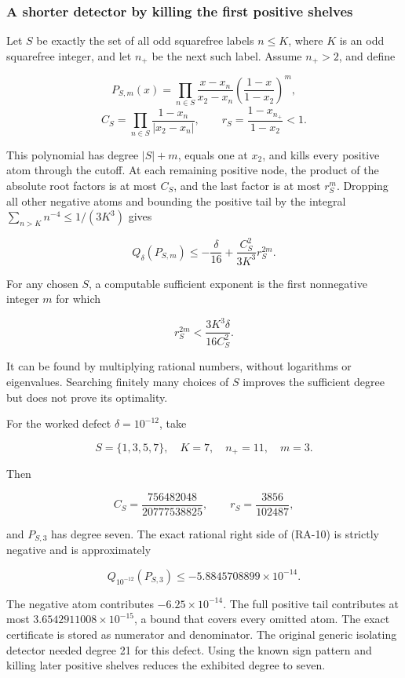 \hypertarget{v11-resolution_full-a-shorter-detector-by-killing-the-first-positive-shelves}{%
\subsubsection{A shorter detector by killing the first positive
shelves}\label{v11-resolution_full-a-shorter-detector-by-killing-the-first-positive-shelves}}

Let \(S\) be exactly the set of all odd squarefree labels \(n\le K\),
where \(K\) is an odd squarefree integer, and let \(n_+\) be the next
such label. Assume \(n_+>2\), and define

\[
P_{S,m}(x)=\prod_{n\in S}\frac{x-x_n}{x_2-x_n}
\left(\frac{1-x}{1-x_2}\right)^m,
\] \[
C_S=\prod_{n\in S}\frac{1-x_n}{|x_2-x_n|},
\qquad r_S=\frac{1-x_{n_+}}{1-x_2}<1.
\]

This polynomial has degree \(|S|+m\), equals one at \(x_2\), and kills
every positive atom through the cutoff. At each remaining positive node,
the product of the absolute root factors is at most \(C_S\), and the
last factor is at most \(r_S^m\). Dropping all other negative atoms and
bounding the positive tail by the integral
\(\sum_{n>K}n^{-4}\le1/(3K^3)\) gives

\[
\boxed{Q_\delta(P_{S,m})\le-\frac\delta{16}
 +\frac{C_S^2}{3K^3}r_S^{2m}.}
\tag{RA-10}
\]

For any chosen \(S\), a computable sufficient exponent is the first
nonnegative integer \(m\) for which

\[
 r_S^{2m}<\frac{3K^3\delta}{16C_S^2}.
\]

It can be found by multiplying rational numbers, without logarithms or
eigenvalues. Searching finitely many choices of \(S\) improves the
sufficient degree but does not prove its optimality.

For the worked defect \(\delta=10^{-12}\), take

\[
S=\{1,3,5,7\},\quad K=7,\quad n_+=11,\quad m=3.
\]

Then

\[
C_S=\frac{756482048}{20777538825},\qquad
r_S=\frac{3856}{102487},
\]

and \(P_{S,3}\) has degree seven. The exact rational right side of
(RA-10) is strictly negative and is approximately

\[
\boxed{Q_{10^{-12}}(P_{S,3})\le-5.8845708899\times10^{-14}.}
\]

The negative atom contributes \(-6.25\times10^{-14}\). The full positive
tail contributes at most \(3.6542911008\times10^{-15}\), a bound that
covers every omitted atom. The exact certificate is stored as numerator
and denominator. The original generic isolating detector needed degree
21 for this defect. Using the known sign pattern and killing later
positive shelves reduces the exhibited degree to seven.

